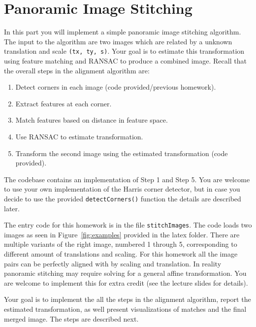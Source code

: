 \documentclass[10pt,letterpaper]{article}
\newcommand{\cmd}[1] {{\color{blue}\texttt{#1}}}
\begin{document}
\newpage
\section{Panoramic Image Stitching}
In this part you will implement a simple panoramic image stitching algorithm. The input to the algorithm are two images which are related by a unknown translation and scale \cmd{(tx, ty, s)}. Your goal is to estimate this transformation using feature matching and RANSAC to produce a combined image. Recall that the overall steps in the alignment algorithm are:

\begin{enumerate}
\item Detect corners in each image (code provided/previous homework).
\item Extract features at each corner.
\item Match features based on distance in feature space.
\item Use RANSAC to estimate transformation.
\item Transform the second image using the estimated transformation (code provided).
\end{enumerate}

The codebase contains an implementation of Step 1 and Step 5. You are welcome to use your own implementation of the Harris corner detector, but in case you decide to use the provided \cmd{detectCorners()} function the details are described later. 

The entry code for this homework is in the file \cmd{stitchImages}. The code loads two images as seen in Figure~\ref{fig:examples} provided in the latex folder. There are multiple variants of the right image, numbered 1 through 5, corresponding to different amount of translations and scaling. 
For this homework all the image pairs can be perfectly aligned with by scaling and translation.
In reality panoramic stitching may require solving for a general affine transformation. You are welcome to implement this for extra credit (see the lecture slides for details). 

Your goal is to implement the all the steps in the alignment algorithm, report the estimated transformation, as well present visualizations of matches and the final merged image. 
The steps are described next.
\end{document}
